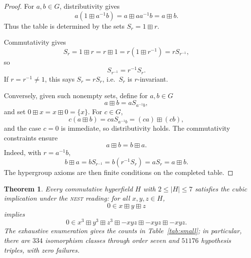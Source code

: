 \documentclass[12pt]{article}
\newtheorem{theorem}{Theorem}[section]
\theoremstyle{definition}
\theoremstyle{remark}
\numberwithin{equation}{section}
\begin{document}
\begin{proof}
For \(a,b\in G\), distributivity gives
\[
a(1\boxplus a^{-1}b)=a\boxplus aa^{-1}b=a\boxplus b.
\]
Thus the table is determined by the sets \(S_r=1\boxplus r\).

Commutativity gives
\[
S_r=1\boxplus r=r\boxplus1=r(1\boxplus r^{-1})=rS_{r^{-1}},
\]
so
\[
S_{r^{-1}}=r^{-1}S_r.
\]
If \(r=r^{-1}\neq1\), this says \(S_r=rS_r\), i.e.\ \(S_r\) is \(r\)-invariant.

Conversely, given such nonempty sets, define for \(a,b\in G\)
\[
a\boxplus b=aS_{a^{-1}b},
\]
and set \(0\boxplus x=x\boxplus0=\{x\}\). For \(c\in G\),
\[
c(a\boxplus b)=caS_{a^{-1}b}=(ca)\boxplus(cb),
\]
and the case \(c=0\) is immediate, so distributivity holds. The commutativity constraints ensure
\[
a\boxplus b=b\boxplus a.
\]
Indeed, with \(r=a^{-1}b\),
\[
b\boxplus a=bS_{r^{-1}}=b(r^{-1}S_r)=a S_r=a\boxplus b.
\]
The hypergroup axioms are then finite conditions on the completed table.
\end{proof}

\begin{theorem}\label{thm:small-orders}
Every commutative hyperfield \(H\) with \(2\le |H|\le7\) satisfies the cubic implication under the \textsc{nest} reading:
for all \(x,y,z\in H\),
\[
0\in x\boxplus y\boxplus z
\]
implies
\[
0\in x^3\boxplus y^3\boxplus z^3\boxplus -xyz\boxplus -xyz\boxplus -xyz.
\]
The exhaustive enumeration gives the counts in Table~\ref{tab:small}; in particular, there are \(334\) isomorphism classes through order seven and \(51176\) hypothesis triples, with zero failures.
\end{theorem}
\end{document}
